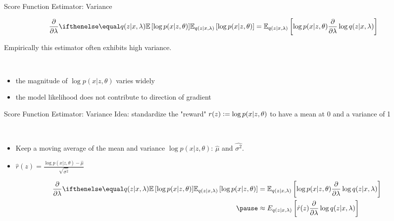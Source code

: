 \begin{frame}{Score Function Estimator: Variance}
\begin{small}
\begin{equation*}
\begin{aligned}
&\pdv{\lambda}\E[q(z|x,\lambda)]{\log p(x|z,\theta)}
= \mathbb E_{q(z|x,\lambda)} \left[  \log p(x|z,\theta)  \pdv{\lambda}\log q(z|x,\lambda)\right]
\end{aligned}
\end{equation*}
\end{small}


Empirically this estimator often exhibits high variance.

~

\pause 

\begin{itemize}
	\item the magnitude of $\log p(x|z, \theta)$ varies widely \pause 
	\item the model likelihood does not contribute to direction of gradient 
\end{itemize}
\end{frame}


\begin{frame}{Score Function Estimator: Variance}
Idea: standardize the "reward" $r(z) \vcentcolon= \log p(x|z, \theta)$ to have a mean at 0 and a variance of 1 \pause

~ 

\begin{itemize}
  \setlength\itemsep{0.7em}
    \item Keep a moving average of the mean and variance $\log p(x|z, \theta)$: $\hat{\mu}$ and $\hat{\sigma^2}$. \pause
    \item $\hat{r}(z) = \frac{\log p(x|z, \theta)-\hat{\mu}}{\sqrt{\hat{\sigma^2}}}$
\end{itemize}

\pause

\begin{small}
\begin{equation*}
\begin{aligned}
\pdv{\lambda}\E[q(z|x,\lambda)]{\log p(x|z,\theta)}
&= \mathbb E_{q(z|x,\lambda)} \left[  \log p(x|z,\theta)  \pdv{\lambda}\log q(z|x,\lambda)\right]\\ \pause
&\approx E_{q(z|x,\lambda)} \left[  \hat{r}(z) \pdv{\lambda}\log q(z|x,\lambda)\right]
\end{aligned}
\end{equation*}
\end{small}

\end{frame}

